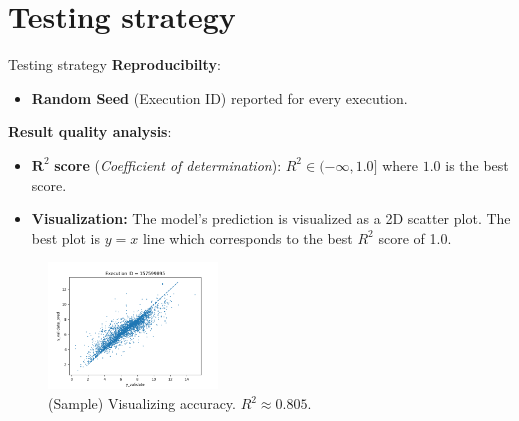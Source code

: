 \documentclass{beamer}
\begin{document}
\section{Testing strategy}

\begin{frame}[t]{Testing strategy}
\textbf{Reproducibilty}:
\begin{itemize}
\item \textbf{Random Seed} (Execution ID) reported for every execution.
\end{itemize}

\textbf{Result quality analysis}:
\begin{itemize}
\item $\mathbf{R}^2$ \textbf{score} (\textit{Coefficient of determination}): $R^2  \in (- \infty, 1.0]$ where $1.0$ is the best score. 
\item \textbf{Visualization:}
The model's prediction is visualized as a 2D scatter plot. 
The best plot is $y = x$ line which corresponds to the best $R^2$ score of 1.0.

\end{itemize}

\begin{figure}[htb]
  \centering
    \includegraphics[width=0.40\textwidth]{images/accuracy_validate}
    \caption{(Sample) Visualizing accuracy.  $R^2 \approx 0.805$.}
    \label{fig:modelQualityVisualization}
\end{figure}

\end{frame}
\end{document}
